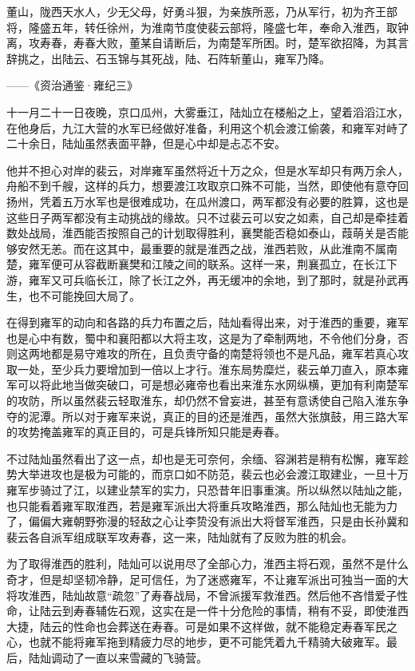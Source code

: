 董山，陇西天水人，少无父母，好勇斗狠，为亲族所恶，乃从军行，初为齐王部将，隆盛五年，转任徐州，为淮南节度使裴云部将，隆盛七年，奉命入淮西，取钟离，攻寿春，寿春大败，董某自请断后，为南楚军所困。时，楚军欲招降，为其言辞挑之，出陆云、石玉锦与其死战，陆、石阵斩董山，雍军乃降。

——《资治通鉴·雍纪三》

十一月二十一日夜晚，京口瓜州，大雾垂江，陆灿立在楼船之上，望着滔滔江水，在他身后，九江大营的水军已经做好准备，利用这个机会渡江偷袭，和雍军对峙了二十余日，陆灿虽然表面平静，但是心中却是忐忑不安。

他并不担心对岸的裴云，对岸雍军虽然将近十万之众，但是水军却只有两万余人，舟船不到千艘，这样的兵力，想要渡江攻取京口殊不可能，当然，即使他有意夺回扬州，凭着五万水军也是很难成功，在瓜州渡口，两军都没有必要的胜算，这也是这些日子两军都没有主动挑战的缘故。只不过裴云可以安之如素，自己却是牵挂着数处战局，淮西能否按照自己的计划取得胜利，襄樊能否稳如泰山，葭萌关是否能够安然无恙。而在这其中，最重要的就是淮西之战，淮西若败，从此淮南不属南楚，雍军便可从容截断襄樊和江陵之间的联系。这样一来，荆襄孤立，在长江下游，雍军又可兵临长江，除了长江之外，再无缓冲的余地，到了那时，就是孙武再生，也不可能挽回大局了。

在得到雍军的动向和各路的兵力布置之后，陆灿看得出来，对于淮西的重要，雍军也是心中有数，蜀中和襄阳都以大将主攻，这是为了牵制两地，不令他们分身，否则这两地都是易守难攻的所在，且负责守备的南楚将领也不是凡品，雍军若真心攻取一处，至少兵力要增加到一倍以上才行。淮东局势糜烂，裴云单刀直入，原本雍军可以将此地当做突破口，可是想必雍帝也看出来淮东水网纵横，更加有利南楚军的攻防，所以虽然裴云轻取淮东，却仍然不曾妄进，甚至有意诱使自己陷入淮东争夺的泥潭。所以对于雍军来说，真正的目的还是淮西，虽然大张旗鼓，用三路大军的攻势掩盖雍军的真正目的，可是兵锋所知只能是寿春。

不过陆灿虽然看出了这一点，却也是无可奈何，余缅、容渊若是稍有松懈，雍军趁势大举进攻也是极为可能的，而京口如不防范，裴云也必会渡江取建业，一旦十万雍军步骑过了江，以建业禁军的实力，只恐昔年旧事重演。所以纵然以陆灿之能，也只能看着雍军取淮西，若是雍军派出大将重兵攻略淮西，那么陆灿也无能为力了，偏偏大雍朝野弥漫的轻敌之心让李贽没有派出大将督军淮西，只是由长孙冀和裴云各自派军组成联军攻寿春，这一来，陆灿就有了反败为胜的机会。

为了取得淮西的胜利，陆灿可以说用尽了全部心力，淮西主将石观，虽然不是什么奇才，但是却坚韧冷静，足可信任，为了迷惑雍军，不让雍军派出可独当一面的大将攻淮西，陆灿故意“疏忽”了寿春战局，不曾派援军救淮西。然后他不吝惜爱子性命，让陆云到寿春辅佐石观，这实在是一件十分危险的事情，稍有不妥，即使淮西大捷，陆云的性命也会葬送在寿春。可是如果不这样做，就不能稳定寿春军民之心，也就不能将雍军拖到精疲力尽的地步，更不可能凭着九千精骑大破雍军。最后，陆灿调动了一直以来雪藏的飞骑营。

